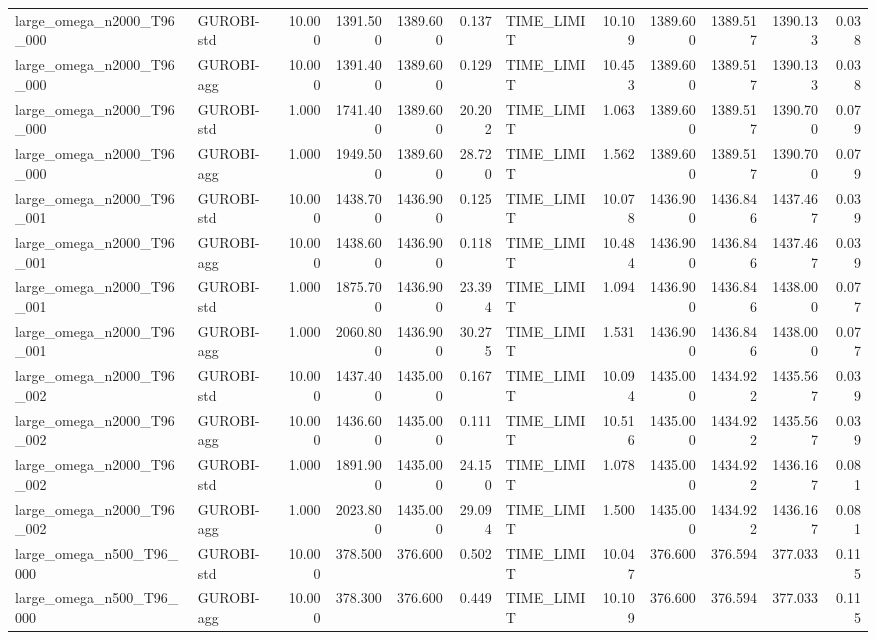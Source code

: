 \begin{table}[htbp]
\begin{tabular}{llrrrrlrrrrr}
large\_omega\_n2000\_T96\_000 & GUROBI-std & 10.000 & 1391.500 & 1389.600 & 0.137 & TIME\_LIMIT & 10.109 & 1389.600 & 1389.517 & 1390.133 & 0.038 \\
large\_omega\_n2000\_T96\_000 & GUROBI-agg & 10.000 & 1391.400 & 1389.600 & 0.129 & TIME\_LIMIT & 10.453 & 1389.600 & 1389.517 & 1390.133 & 0.038 \\
large\_omega\_n2000\_T96\_000 & GUROBI-std & 1.000 & 1741.400 & 1389.600 & 20.202 & TIME\_LIMIT & 1.063 & 1389.600 & 1389.517 & 1390.700 & 0.079 \\
large\_omega\_n2000\_T96\_000 & GUROBI-agg & 1.000 & 1949.500 & 1389.600 & 28.720 & TIME\_LIMIT & 1.562 & 1389.600 & 1389.517 & 1390.700 & 0.079 \\
large\_omega\_n2000\_T96\_001 & GUROBI-std & 10.000 & 1438.700 & 1436.900 & 0.125 & TIME\_LIMIT & 10.078 & 1436.900 & 1436.846 & 1437.467 & 0.039 \\
large\_omega\_n2000\_T96\_001 & GUROBI-agg & 10.000 & 1438.600 & 1436.900 & 0.118 & TIME\_LIMIT & 10.484 & 1436.900 & 1436.846 & 1437.467 & 0.039 \\
large\_omega\_n2000\_T96\_001 & GUROBI-std & 1.000 & 1875.700 & 1436.900 & 23.394 & TIME\_LIMIT & 1.094 & 1436.900 & 1436.846 & 1438.000 & 0.077 \\
large\_omega\_n2000\_T96\_001 & GUROBI-agg & 1.000 & 2060.800 & 1436.900 & 30.275 & TIME\_LIMIT & 1.531 & 1436.900 & 1436.846 & 1438.000 & 0.077 \\
large\_omega\_n2000\_T96\_002 & GUROBI-std & 10.000 & 1437.400 & 1435.000 & 0.167 & TIME\_LIMIT & 10.094 & 1435.000 & 1434.922 & 1435.567 & 0.039 \\
large\_omega\_n2000\_T96\_002 & GUROBI-agg & 10.000 & 1436.600 & 1435.000 & 0.111 & TIME\_LIMIT & 10.516 & 1435.000 & 1434.922 & 1435.567 & 0.039 \\
large\_omega\_n2000\_T96\_002 & GUROBI-std & 1.000 & 1891.900 & 1435.000 & 24.150 & TIME\_LIMIT & 1.078 & 1435.000 & 1434.922 & 1436.167 & 0.081 \\
large\_omega\_n2000\_T96\_002 & GUROBI-agg & 1.000 & 2023.800 & 1435.000 & 29.094 & TIME\_LIMIT & 1.500 & 1435.000 & 1434.922 & 1436.167 & 0.081 \\
large\_omega\_n500\_T96\_000 & GUROBI-std & 10.000 & 378.500 & 376.600 & 0.502 & TIME\_LIMIT & 10.047 & 376.600 & 376.594 & 377.033 & 0.115 \\
large\_omega\_n500\_T96\_000 & GUROBI-agg & 10.000 & 378.300 & 376.600 & 0.449 & TIME\_LIMIT & 10.109 & 376.600 & 376.594 & 377.033 & 0.115 \\

\end{tabular}
\end{table}
